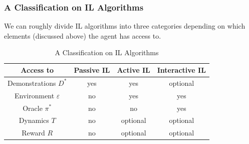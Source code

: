 \documentclass[11pt]{article}
\begin{document}
\subsubsection{A Classification on IL Algorithms}

We can roughly divide IL algorithms into three categories depending on which elements (discussed above) the agent has access to.

\begin{table}[h]
\centering
\begin{tabular}{|c|c|c|c|}
\hline
Access to       & Passive IL & Active IL & Interactive IL \\ \hline
Demonstrations $D^*$     & yes        & yes       & optional       \\ \hline
Environment $\varepsilon$ & no         & yes       & yes            \\ \hline
Oracle $\pi^*$           & no         & no        & yes            \\ \hline
Dynamics $T$             & no         & optional  & optional       \\ \hline
Reward $R$               & no         & optional  & optional       \\ \hline
\end{tabular}
\caption{ A Classification on IL Algorithms}
\label{tab:IL-type}
\end{table}
\end{document}
